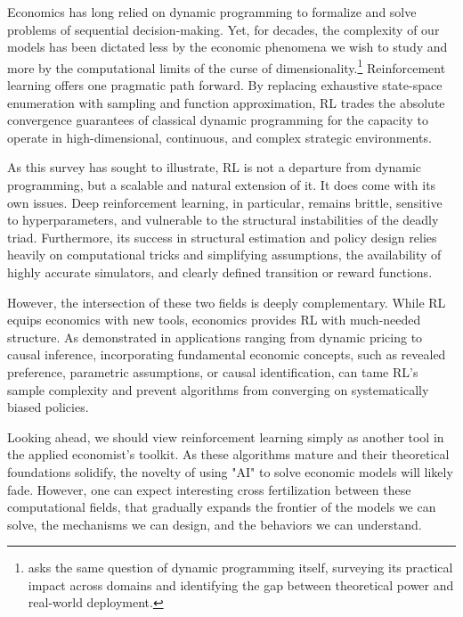 Economics has long relied on dynamic programming to formalize and solve problems of sequential decision-making. Yet, for decades, the complexity of our models has been dictated less by the economic phenomena we wish to study and more by the computational limits of the curse of dimensionality.\footnote{\citet{rust2019decision} asks the same question of dynamic programming itself, surveying its practical impact across domains and identifying the gap between theoretical power and real-world deployment.} Reinforcement learning offers one pragmatic path forward. By replacing exhaustive state-space enumeration with sampling and function approximation, RL trades the absolute convergence guarantees of classical dynamic programming for the capacity to operate in high-dimensional, continuous, and complex strategic environments.

As this survey has sought to illustrate, RL is not a departure from dynamic programming, but a scalable and natural extension of it. It does come with its own issues. Deep reinforcement learning, in particular, remains brittle, sensitive to hyperparameters, and vulnerable to the structural instabilities of the deadly triad. Furthermore, its success in structural estimation and policy design relies heavily on computational tricks and simplifying assumptions, the availability of highly accurate simulators, and clearly defined transition or reward functions.

However, the intersection of these two fields is deeply complementary. While RL equips economics with new tools, economics provides RL with much-needed structure. As demonstrated in applications ranging from dynamic pricing to causal inference, incorporating fundamental economic concepts, such as revealed preference, parametric assumptions, or causal identification, can tame RL’s sample complexity and prevent algorithms from converging on systematically biased policies.

Looking ahead, we should view reinforcement learning simply as another tool in the applied economist’s toolkit. As these algorithms mature and their theoretical foundations solidify, the novelty of using "AI" to solve economic models will likely fade. However, one can expect interesting cross fertilization between these computational fields, that gradually expands the frontier of the models we can solve, the mechanisms we can design, and the behaviors we can understand.
